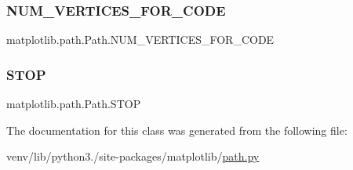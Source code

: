 \subsubsection{\texorpdfstring{N\+U\+M\+\_\+\+V\+E\+R\+T\+I\+C\+E\+S\+\_\+\+F\+O\+R\+\_\+\+C\+O\+DE}{NUM\_VERTICES\_FOR\_CODE}}
{\footnotesize\ttfamily matplotlib.\+path.\+Path.\+N\+U\+M\+\_\+\+V\+E\+R\+T\+I\+C\+E\+S\+\_\+\+F\+O\+R\+\_\+\+C\+O\+DE\hspace{0.3cm}{\ttfamily [static]}}

\mbox{\label{classmatplotlib_1_1path_1_1Path_a9c0f0350d40f9d676f842f7a191cea97}} 
\subsubsection{\texorpdfstring{S\+T\+OP}{STOP}}
{\footnotesize\ttfamily matplotlib.\+path.\+Path.\+S\+T\+OP\hspace{0.3cm}{\ttfamily [static]}}



The documentation for this class was generated from the following file\+:\begin{DoxyCompactItemize}
\item 
venv/lib/python3./site-\/packages/matplotlib/\hyperlink{path_8py}{path.\+py}\end{DoxyCompactItemize}
